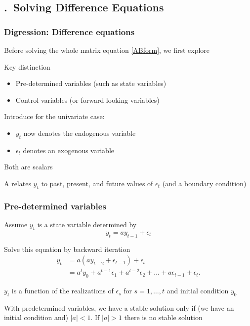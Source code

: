 \documentclass[handout,usepdftitle=false,xcolor=dvipsnames,aspectratio=169]{beamer}
\begin{document}
\subsection{\thesection.\thesubsection \ Solving Difference Equations}

\begin{frame}
\frametitle{Digression: Difference equations}
\begin{witemize}
\item Before solving the whole matrix equation \eqref{ABform}, we first explore 
\item Key distinction
\begin{itemize}
\item Pre-determined variables (such as state variables)
\item Control variables (or forward-looking variables)
\end{itemize}
\item Introduce  for the univariate case:
\begin{itemize}
    \item $y_t$ now denotes the endogenous variable
    \item $\epsilon_t$ denotes an exogenous variable
\end{itemize}
\item Both are scalars
\item A  relates $y_t$ to past, present, and future values of $\epsilon_t$ (and a boundary condition)
\end{witemize}
\end{frame}

\begin{frame}
\frametitle{Pre-determined variables}
\begin{witemize}
\item Assume  $y_t$ is a state variable determined by
\begin{equation}
    y_{t} = a y_{t-1} + \epsilon_{t}
\end{equation}
\item Solve this equation by backward iteration
\begin{align}
y_t &= a (a y_{t-2} + \epsilon_{t-1}) + \epsilon_t\\
&= a^t y_0 + a^{t-1} \epsilon_1 + a^{t-2} \epsilon_2 + ... + a \epsilon_{t-1} + \epsilon_t.
\end{align}
\item $y_t$ is a function of the realizations of $\epsilon_s$ for $s=1,
\dots, t$ and initial condition $y_0$ \vspace{.4cm}
\item With predetermined variables, we have a stable solution only if (we have an initial condition and) $|a| <1$. If $|a| >1$ there is no
stable solution
\end{witemize}
\end{frame}
\end{document}
